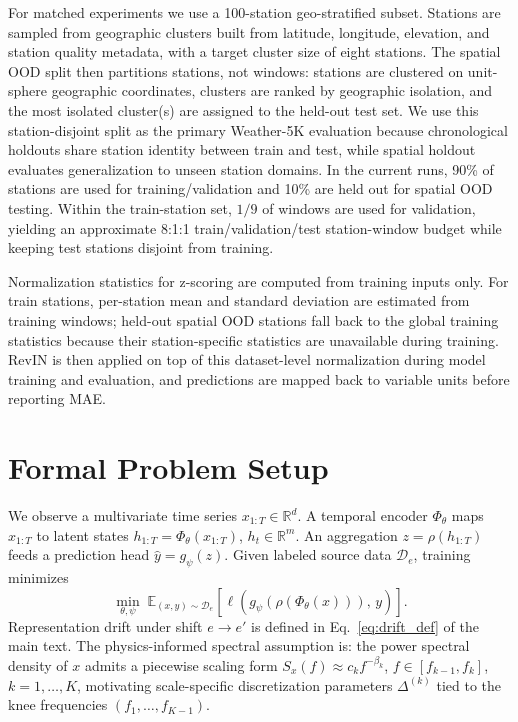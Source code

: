 \documentclass{article}
\begin{document}
For matched experiments we use a 100-station geo-stratified subset. Stations are sampled from geographic clusters built from latitude, longitude, elevation, and station quality metadata, with a target cluster size of eight stations. The spatial OOD split then partitions stations, not windows: stations are clustered on unit-sphere geographic coordinates, clusters are ranked by geographic isolation, and the most isolated cluster(s) are assigned to the held-out test set. We use this station-disjoint split as the primary Weather-5K evaluation because chronological holdouts share station identity between train and test, while spatial holdout evaluates generalization to unseen station domains. In the current runs, 90\% of stations are used for training/validation and 10\% are held out for spatial OOD testing. Within the train-station set, $1/9$ of windows are used for validation, yielding an approximate 8:1:1 train/validation/test station-window budget while keeping test stations disjoint from training.

Normalization statistics for z-scoring are computed from training inputs only. For train stations, per-station mean and standard deviation are estimated from training windows; held-out spatial OOD stations fall back to the global training statistics because their station-specific statistics are unavailable during training. RevIN is then applied on top of this dataset-level normalization during model training and evaluation, and predictions are mapped back to variable units before reporting MAE.

\section{Formal Problem Setup}
\label{sec:appx:problem_setup}

We observe a multivariate time series $x_{1:T} \in \mathbb{R}^{d}$.
A temporal encoder $\Phi_{\theta}$ maps $x_{1:T}$ to latent states $h_{1:T} = \Phi_{\theta}(x_{1:T})$, $h_t \in \mathbb{R}^m$.
An aggregation $z = \rho(h_{1:T})$ feeds a prediction head $\hat{y} = g_{\psi}(z)$.
Given labeled source data $\mathcal{D}_{e}$, training minimizes
\begin{equation}
\min_{\theta,\psi}\;\mathbb{E}_{(x,y)\sim \mathcal{D}_{e}}\!\left[\ell\!\left(g_{\psi}(\rho(\Phi_{\theta}(x))),\,y\right)\right].
\end{equation}
Representation drift under shift $e \to e'$ is defined in Eq.~\eqref{eq:drift_def} of the main text.
The physics-informed spectral assumption is: the power spectral density of $x$ admits a piecewise scaling form $S_x(f) \approx c_k f^{-\beta_k}$, $f \in [f_{k-1}, f_k]$, $k=1,\dots,K$, motivating scale-specific discretization parameters $\Delta^{(k)}$ tied to the knee frequencies $(f_1,\dots,f_{K-1})$.
\end{document}
